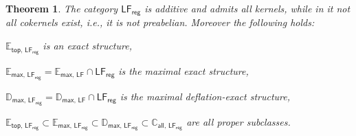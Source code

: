 \documentclass[11pt, a4paper, reqno]{amsart}
\newtheorem{thm}{Theorem}
\theoremstyle{definition}
\newcommand{\CC}{\mathbb{C}}
\newcommand{\EE}{\mathbb{E}}
\newcommand{\DD}{\mathbb{D}}
\newcommand{\LF}{\mathsf{LF}}
\newcommand{\LFr}{\mathsf{LF}_{\mathsf{reg}}}
\begin{document}
\begin{thm}\label{COR}The category $\LFr$ is additive and admits all kernels, while in it not all cokernels exist, i.e., it is not preabelian. Moreover the following holds: \vspace{2pt}
\begin{compactitem}

\item[(i)] $\EE_{\mathsf{top},\,\LFr}$ is an exact structure,\vspace{2pt}
\item[(ii)] $\EE_{\mathsf{max},\,\LFr}=\EE_{\mathsf{max},\,\LF}\cap\LFr$ is the maximal exact structure,\vspace{2pt}
\item[(iii)] $\DD_{\mathsf{max},\,\LFr}=\DD_{\mathsf{max},\,\LF}\cap\LFr$ is the maximal deflation-exact structure,\vspace{2pt}
\item[(iv)] $\EE_{\mathsf{top},\,\LFr}\subset\EE_{\mathsf{max},\,\LFr}\subset\DD_{\mathsf{max},\,\LFr}\subset\CC_{\mathsf{all},\,\LFr}$ are all proper subclasses.
\end{compactitem}
\end{thm}
\end{document}
